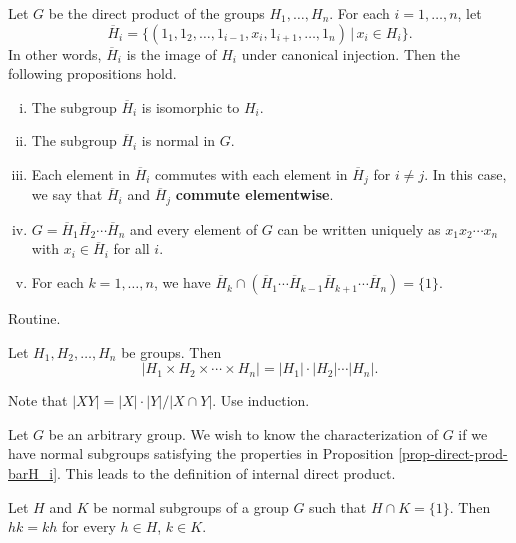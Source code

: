 \begin{proposition} \label{prop-direct-prod-barH_i}
	Let $G$ be the direct product of the groups $H_1, \ldots, H_n$. For each $i=1,\dots, n$,  let
	\begin{equation*}
		\overline{H}_i = \{(1_1, 1_2, \ldots, 1_{i-1}, x_i, 1_{i+1}, \ldots, 1_n)\,|\, x_i \in H_i\}.
	\end{equation*}
	In other words, $\overline{H}_i$ is the image of $H_i$ under canonical injection. Then the following propositions hold.
	\begin{enumerate}[(i)]
		\item The subgroup $\overline{H}_i$ is isomorphic to $H_i$.
		\item The subgroup $\overline{H}_i$ is normal in $G$.
		\item Each element in $\overline{H}_i$ commutes  with each element in $\overline{H}_j$ for $i\neq j$. In this case, we say that $\overline{H}_i$ and $\overline{H}_j$ \textbf{commute elementwise}.
		\item $G = \overline{H}_1 \overline{H}_2 \cdots \overline{H}_n$ and every element of $G$ can be written uniquely as $x_1 x_2 \cdots x_n$ with $x_i \in \overline{H}_i$ for all $i$.
		\item For each $k=1,\dots, n$, we have $\overline{H}_k \cap (\overline{H}_1\cdots \overline{H}_{k-1}\overline{H}_{k+1}\cdots \overline{H}_n )= \{1\}$.
	\end{enumerate}
\end{proposition}
\begin{sketch}
	Routine.
\end{sketch}
\begin{corollary}
	Let $H_1, H_2, \ldots, H_n$ be groups. Then
	\begin{equation*}
		|H_1\times H_2\times \cdots \times H_n| = |H_1|\cdot |H_2| \cdots |H_n|.
	\end{equation*}
\end{corollary}
\begin{sketch}
	Note that $|XY| = |X|\cdot |Y|/|X\cap Y|$. Use induction.
\end{sketch}
Let $G$ be an arbitrary group. We wish to know the characterization of $G$ if we have normal subgroups satisfying the properties in Proposition \ref{prop-direct-prod-barH_i}. This leads to the definition of internal direct product.
\begin{lemma} \label{lemma-indp-normal-subgrps-commute}
	Let $H$ and $K$ be normal subgroups of a group $G$ such that $H\cap K = \{1\}$.  Then $hk = kh$ for every $h\in H$, $k\in K$.
\end{lemma}
